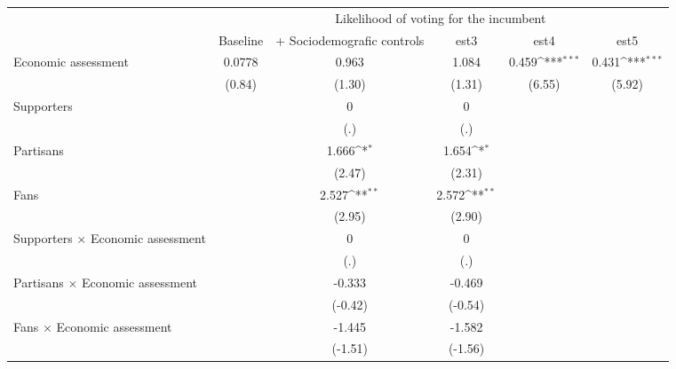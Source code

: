 {
\def\sym#1{\ifmmode^{#1}\else\(^{#1}\)\fi}
\begin{tabular}{l*{5}{c}}
\toprule
                &\multicolumn{5}{c}{Likelihood of voting for the incumbent}                                    \\\cmidrule(lr){2-6}
                & Baseline         &+ Sociodemografic controls         &     est3         &     est4         &     est5         \\
\midrule
Economic assessment&   0.0778         &    0.963         &    1.084         &    0.459\sym{***}&    0.431\sym{***}\\
                &   (0.84)         &   (1.30)         &   (1.31)         &   (6.55)         &   (5.92)         \\
Supporters      &                  &        0         &        0         &                  &                  \\
                &                  &      (.)         &      (.)         &                  &                  \\
Partisans       &                  &    1.666\sym{*}  &    1.654\sym{*}  &                  &                  \\
                &                  &   (2.47)         &   (2.31)         &                  &                  \\
Fans            &                  &    2.527\sym{**} &    2.572\sym{**} &                  &                  \\
                &                  &   (2.95)         &   (2.90)         &                  &                  \\
Supporters $\times$ Economic assessment&                  &        0         &        0         &                  &                  \\
                &                  &      (.)         &      (.)         &                  &                  \\
Partisans $\times$ Economic assessment&                  &   -0.333         &   -0.469         &                  &                  \\
                &                  &  (-0.42)         &  (-0.54)         &                  &                  \\
Fans $\times$ Economic assessment&                  &   -1.445         &   -1.582         &                  &                  \\
                &                  &  (-1.51)         &  (-1.56)         &                  &                  \\

\end{tabular}}
